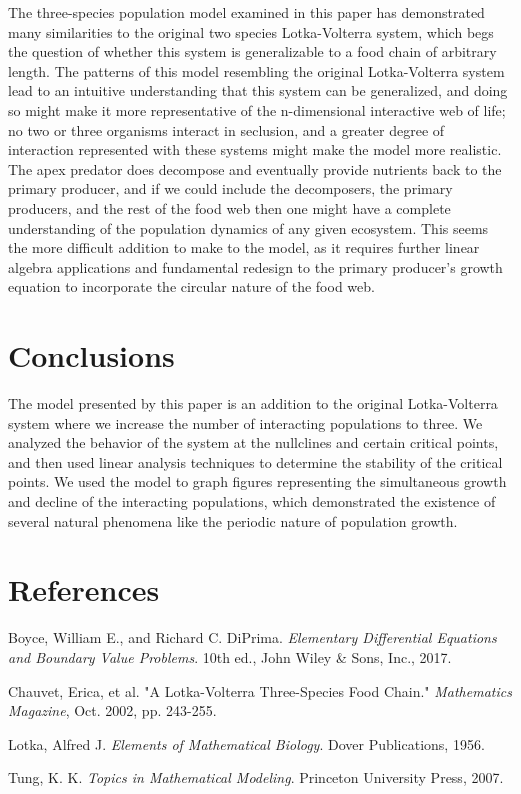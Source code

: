 \documentclass[11pt,oneside]{article}
\begin{document}
	The three-species population model examined in this paper has demonstrated many similarities to the original two species Lotka-Volterra system, which begs the question of whether this system is generalizable to a food chain of arbitrary length. The patterns of this model resembling the original Lotka-Volterra system lead to an intuitive understanding that this system can be generalized, and doing so might make it more representative of the n-dimensional interactive web of life; no two or three organisms interact in seclusion, and a greater degree of interaction represented with these systems might make the model more realistic. The apex predator does decompose and eventually provide nutrients back to the primary producer, and if we could include the decomposers, the primary producers, and the rest of the food web then one might have a complete understanding of the population dynamics of any given ecosystem. This seems the more difficult addition to make to the model, as it requires further linear algebra applications and fundamental redesign to the primary producer's growth equation to incorporate the circular nature of the food web.
	
	
	\section{Conclusions}
	The model presented by this paper is an addition to the original Lotka-Volterra system where we increase the number of interacting populations to three. We analyzed the behavior of the system at the nullclines and certain critical points, and then used linear analysis techniques to determine the stability of the critical points. We used the model to graph figures representing the simultaneous growth and decline of the interacting populations, which demonstrated the existence of several natural phenomena like the periodic nature of population growth.
	
	
	\section{References}
	\begin{hangparas}{.25in}{1}
		Boyce, William E., and Richard C. DiPrima. \textit{Elementary Differential Equations and Boundary Value Problems}. 10th ed., John Wiley \& Sons, Inc., 2017.
		
		Chauvet, Erica, et al. "A Lotka-Volterra Three-Species Food Chain." \textit{Mathematics Magazine}, Oct. 2002, pp. 243-255.
		
		Lotka, Alfred J. \textit{Elements of Mathematical Biology}. Dover Publications, 1956.
		
		Tung, K. K. \textit{Topics in Mathematical Modeling}. Princeton University Press, 2007.
		
		
	\end{hangparas}
	
\end{document}
